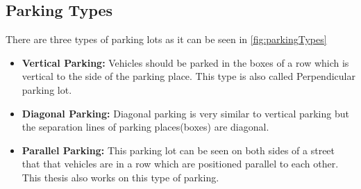\subsection{Parking Types}
There are three types of parking lots as it can be seen in \ref{fig:parkingTypes} \cite{novel-CLMR}
\begin{itemize}
    \item \textbf{Vertical Parking:} Vehicles should be parked in the boxes of a row which is vertical to the side of the parking place. This type is also called Perpendicular parking lot.
    \item \textbf{Diagonal Parking:} Diagonal parking is very similar to vertical parking but the separation lines of parking places(boxes) are diagonal.
    \item \textbf{Parallel Parking:} This parking lot can be seen on both sides of a street that that vehicles are in a row which are positioned parallel to each other. This thesis also works on this type of parking.
\end{itemize}
